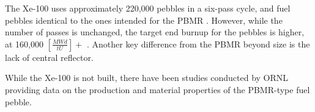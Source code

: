 The Xe-100 uses approximately 220,000 pebbles in a six-pass cycle, and fuel pebbles identical to the ones intended for the PBMR \cite{harlan_x-energy_2018}.  However, while the number of passes is unchanged, the target end burnup for the pebbles is higher, at 160,000 $\left[\frac{MWd}{tU}\right]+$ \cite{agnihotri_intrinsically_2017}.  Another key difference from the PBMR beyond size is the lack of central reflector.

While the Xe-100 is not built, there have been studies conducted by ORNL providing data on the production and material properties of the PBMR-type fuel pebble.
